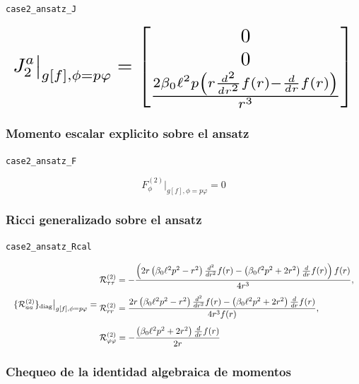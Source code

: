 \documentclass[11pt,a4paper]{article}
\begin{document}
\noindent\texttt{case2\_ansatz\_J}\par\nopagebreak[4]

\[
\resizebox{\textwidth}{!}{$\displaystyle J_2^a\big|_{g[f],\phi=p\varphi} = \left[\begin{matrix}0\\0\\\frac{2 \beta_{0} \ell^{2} p \left(r \frac{d^{2}}{d r^{2}} f{\left(r \right)} - \frac{d}{d r} f{\left(r \right)}\right)}{r^{3}}\end{matrix}\right]$}
\]

\subsubsection{Momento escalar explicito sobre el ansatz}

\noindent\texttt{case2\_ansatz\_F}\par\nopagebreak[4]

\[
F_\phi^{(2)}\big|_{g[f],\phi=p\varphi} = 0
\]

\subsubsection{Ricci generalizado sobre el ansatz}

\noindent\texttt{case2\_ansatz\_Rcal}\par\nopagebreak[4]

\[
\resizebox{\textwidth}{!}{$\displaystyle \{\mathcal R^{(2)}_{aa}\}_{\rm diag}\big|_{g[f],\phi=p\varphi} = \begin{aligned}&\mathcal R^{(2)}_{\tau\tau}=- \frac{\left(2 r \left(\beta_{0} \ell^{2} p^{2} - r^{2}\right) \frac{d^{2}}{d r^{2}} f{\left(r \right)} - \left(\beta_{0} \ell^{2} p^{2} + 2 r^{2}\right) \frac{d}{d r} f{\left(r \right)}\right) f{\left(r \right)}}{4 r^{3}},\\[4pt]&\mathcal R^{(2)}_{rr}=\frac{2 r \left(\beta_{0} \ell^{2} p^{2} - r^{2}\right) \frac{d^{2}}{d r^{2}} f{\left(r \right)} - \left(\beta_{0} \ell^{2} p^{2} + 2 r^{2}\right) \frac{d}{d r} f{\left(r \right)}}{4 r^{3} f{\left(r \right)}},\\[4pt]&\mathcal R^{(2)}_{\varphi\varphi}=- \frac{\left(\beta_{0} \ell^{2} p^{2} + 2 r^{2}\right) \frac{d}{d r} f{\left(r \right)}}{2 r}\end{aligned}$}
\]

\subsubsection{Chequeo de la identidad algebraica de momentos}
\end{document}
